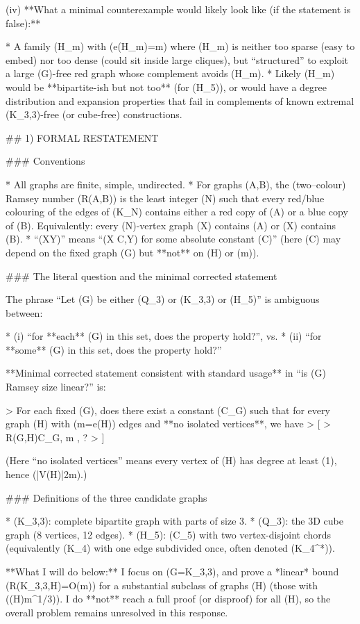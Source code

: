 (iv) **What a minimal counterexample would likely look like (if the statement is false):**

* A family (H_m) with (e(H_m)=m) where (H_m) is neither too sparse (easy to embed) nor too dense (could sit inside large cliques), but “structured” to exploit a large (G)-free red graph whose complement avoids (H_m).
* Likely (H_m) would be **bipartite-ish but not too** (for (H_5)), or would have a degree distribution and expansion properties that fail in complements of known extremal (K_{3,3})-free (or cube-free) constructions.


## 1) FORMAL RESTATEMENT

### Conventions

* All graphs are finite, simple, undirected.
* For graphs (A,B), the (two–colour) Ramsey number (R(A,B)) is the least integer (N) such that every red/blue colouring of the edges of (K_N) contains either a red copy of (A) or a blue copy of (B). Equivalently: every (N)-vertex graph (X) contains (A) or (\overline X) contains (B).
* “(X\ll Y)” means “(X \le C,Y) for some absolute constant (C)” (here (C) may depend on the fixed graph (G) but **not** on (H) or (m)).

### The literal question and the minimal corrected statement

The phrase “Let (G) be either (Q_3) or (K_{3,3}) or (H_5)” is ambiguous between:

* (i) “for **each** (G) in this set, does the property hold?”, vs.
* (ii) “for **some** (G) in this set, does the property hold?”

**Minimal corrected statement consistent with standard usage** in “is (G) Ramsey size linear?” is:

> For each fixed (G), does there exist a constant (C_G) such that for every graph (H) with (m=e(H)) edges and **no isolated vertices**, we have
> [
> R(G,H)\le C_G, m , ?
> ]

(Here “no isolated vertices” means every vertex of (H) has degree at least (1), hence (|V(H)|\le 2m).)

### Definitions of the three candidate graphs

* (K_{3,3}): complete bipartite graph with parts of size 3.
* (Q_3): the 3D cube graph (8 vertices, 12 edges).
* (H_5): (C_5) with two vertex-disjoint chords (equivalently (K_4) with one edge subdivided once, often denoted (K_4^*)).

**What I will do below:** I focus on (G=K_{3,3}), and prove a *linear* bound (R(K_{3,3},H)=O(m)) for a substantial subclass of graphs (H) (those with (\Delta(H)\le m^{1/3})). I do **not** reach a full proof (or disproof) for all (H), so the overall problem remains unresolved in this response.

